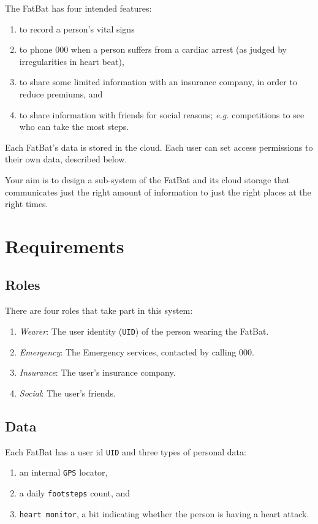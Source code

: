 \documentclass[11pt]{article}
\begin{document}
The FatBat has four intended features:
\begin{enumerate}
        \item to record a person's vital signs
	\item to phone 000 when a person suffers from a cardiac arrest (as judged by irregularities in heart beat),
	\item to share some limited information with an insurance company, in order to reduce premiums, and
	\item to share information with friends for social reasons; {\it e.g. } competitions to see who can take the most steps.
\end{enumerate}

Each FatBat's data is stored in the cloud.  Each user can set access permissions to their own data, described below.

Your aim is to design a sub-system of the FatBat and its cloud storage that communicates just the right amount of information to just the right places at the right times.

\section{Requirements}
\label{sec:requirements}

\subsection{Roles}

There are four roles that take part in this system:

\begin{enumerate}

 \item \emph{Wearer}: The user identity (\texttt{UID}) of the person wearing the FatBat.

 \item \emph{Emergency}: The Emergency services, contacted by calling 000.

 \item \emph{Insurance}: The user's insurance company.
 
 \item \emph{Social}: The user's friends.
 
\end{enumerate}



\subsection{Data}
Each FatBat has a user id \texttt{UID} and three types of personal data:
\begin{enumerate}
	\item an internal \texttt{GPS} locator,
	\item a daily \texttt{footsteps} count, and
	\item \texttt{heart monitor}, a bit indicating whether the person is having a heart attack.
\end{enumerate}
\end{document}
